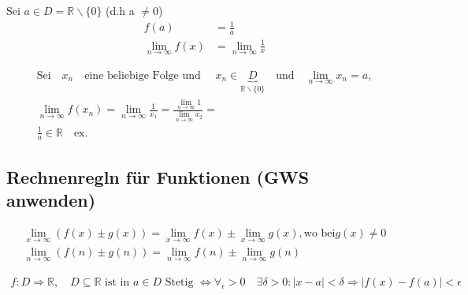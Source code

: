 \begin{beweis}
	Sei $ a \in D = \mathbb{R} \backslash \{0 \}$ (d.h a $\neq 0$) 
	\begin{align*}
	f(a)  &= \frac{1}{a} \tag{1} \\ 
	\lim_{n \to \infty}{f(x)}  &=
	\lim_{n \to \infty}{\frac{1}{x}} \tag{2}
	\end{align*} 
	
	\begin{gather*}
	\text{Sei} \quad x_n \quad \text{eine beliebige Folge und }\quad x_n \in \underbrace{D}_{\mathbb{R}\backslash \{ 0 \}}  \quad \text{und}\quad 
	\lim_{n \to \infty}{x_n}=a , \\
	\lim_{n \to \infty}{f(x_n)} =  \lim_{n \to \infty}{\frac{1}{x_1}} = 
	\frac{\lim\limits_{n \rightarrow \infty}{1}}{\lim\limits_{n \rightarrow \infty}{x_2}} = \\ 
	\frac{1}{a} \in \mathbb{R} \quad \text{ex.}
	\end{gather*}
\end{beweis}  
\subsection{Rechnenregln für Funktionen (GWS anwenden)}
\begin{gather*} 
\lim\limits_{x \rightarrow \infty}{(f(x) \pm g(x))} =\lim\limits_{x \rightarrow \infty}{f(x)} \pm  \lim\limits_{x \rightarrow \infty}{g(x)} , \text{wo bei} g(x)\neq 0  \\
\lim\limits_{n \rightarrow \infty}{(f(n) \pm g(n))} =\lim\limits_{n \rightarrow \infty}{f(n)} \pm  \lim\limits_{n \rightarrow \infty}{g(n)} 
\end{gather*}

\begin{theorem}
	\begin{gather}
	f: D \Rightarrow \mathbb{R} , \quad D \subseteq \mathbb{R} \text{ ist in } a \in D \text{ Stetig }
	\Leftrightarrow \forall_{\epsilon} > 0 \quad \exists \delta > 0 : |x-a| < \delta \Rightarrow |f(x)- f(a)|< \epsilon 
	\end{gather} 
\end{theorem}

